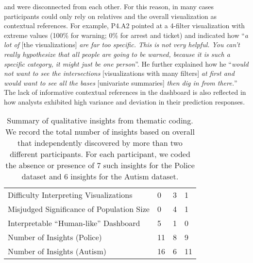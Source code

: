 and were disconnected from each other.
For this reason, in many cases\change{,}
participants could only rely on relatives
and the overall visualization as contextual references.
For example, P4.A2 pointed at a 4-filter visualization
with extreme values (100\% for warning; 0\% for arrest and ticket)
and indicated how ``\textit{a lot of} [the visualizations]
\textit{are far too specific. This is not very helpful.
You can't really hypothesize that all people are} \change{[sic]}
\textit{going to be warned, because it is such a specific category,
it might just be one person}''. %
He further explained how he ``\textit{would not want to see the intersections} [visualizations with many filters] \textit{at first and would want to see all the bases} [univariate summaries] \textit{then dig in from there.}'' The lack of informative contextual references in the \cluster dashboard is also reflected in how analysts exhibited high variance and deviation in their prediction responses. %
\begin{table*}[ht!]
	\begin{tabular}{l|l|l|l}
	& \system & \cluster & \BFS \\ \hline
	Difficulty Interpreting Visualizations & 0 & \cellcolor[HTML]{FD6864}3 & 1 \\ \hline
	Misjudged Significance of Population Size & 0 & \cellcolor[HTML]{FD6864}4 & 1 \\ \hline
	Interpretable ``Human-like'' Dashboard & \cellcolor[HTML]{9AFF99}5 & 1 & 0 \\ \hline
	Number of Insights (Police) & \cellcolor[HTML]{9AFF99}11 & 8 & 9 \\ \hline
	Number of Insights (Autism) & \cellcolor[HTML]{9AFF99}16 & 6 & 11 \\
	\end{tabular}
\caption{Summary of qualitative insights from thematic coding. We record the total number of insights based on overall  that  independently discovered by more than two different participants. For each participant, we coded the absence or presence of 7 such insights for the Police dataset and 6 insights for the Autism dataset.}%
\label{table:thematic_summary}
\vspace{-20pt}
\end{table*}
